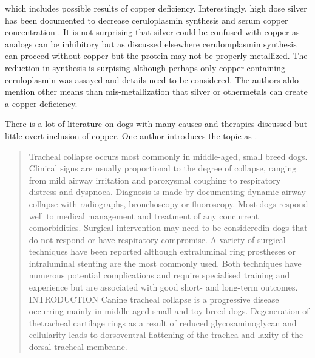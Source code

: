 {which includes  possible results of copper deficiency. Interestingly,
high dose silver has been documented to 
decrease ceruloplasmin synthesis and serum copper
concentration 
\cite{Natelson_Baker_Pyatt_Anemia_leukopenia_following_2019}
\cite{Stepien_Taylor_Colloidal_silver_ingestion_with_2012}.
It is not surprising that silver could be confused with copper
as analogs can be inhibitory but as discussed elsewhere
cerulomplasmin synthesis can proceed without copper
but the protein may not be properly metallized. The reduction
in synthesis is surpising although perhaps only copper containing
ceruloplasmin was assayed and details need to be considered.
The authors aldo mention other means 
than mis-metallization that silver or othermetals can create
a copper deficiency.


There is a lot of literature on dogs with many causes and
therapies discussed but little overt inclusion of copper.
One author introduces the topic as 
\cite{Tappin_Canine_tracheal_collapse_2016}.
\begin{quote}
Tracheal collapse occurs most commonly in middle-aged,
small breed dogs. Clinical signs are usually proportional to the degree of
collapse, ranging from mild airway irritation and paroxysmal coughing to
respiratory distress and dyspnoea. Diagnosis is made by documenting dynamic
airway collapse with radiographs, bronchoscopy or fluoroscopy. Most dogs
respond well to medical management and treatment of any concurrent comorbidities.
Surgical intervention may need to be consideredin dogs that do not respond
or have respiratory compromise. A variety of surgical techniques have been
reported although extraluminal ring prostheses or intraluminal stenting
are the most commonly used. Both techniques have numerous potential complications
and require specialised training and experience but are associated with good
short- and long-term outcomes.
INTRODUCTION
Canine tracheal collapse is a
progressive disease occurring mainly in middle-aged small and toy breed dogs.
Degeneration of thetracheal cartilage rings as a result of reduced glycosaminoglycan and
cellularity leads to dorsoventral flattening of the trachea and laxity of
the dorsal tracheal membrane. 
\end{quote}


}
